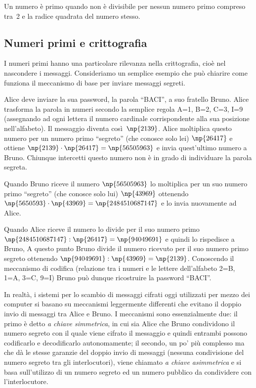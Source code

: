 \osservazione Un numero è primo quando non è divisibile per nessun numero primo compreso tra~2 e
la radice quadrata del numero stesso.

\subsection{Numeri primi e crittografia}
I numeri primi hanno una particolare rilevanza nella crittografia, cioè nel nascondere i messaggi. Consideriamo un semplice esempio che può chiarire come funziona il meccanismo di base per inviare messaggi segreti.

Alice deve inviare la sua password, la parola ``BACI'', a suo fratello Bruno. Alice trasforma la parola in numeri secondo la semplice regola A=1, B=2, C=3, I=9 (assegnando ad ogni lettera il numero cardinale corrispondente alla sua posizione nell'alfabeto). Il messaggio diventa così~$ \np{2139} $. Alice moltiplica questo numero per un numero primo ``segreto'' (che conosce solo lei) $\np{26417}$ e ottiene $\np{2139} \cdot \np{26417}=\np{56505963}$ e invia quest'ultimo numero a Bruno. Chiunque intercetti questo numero non è in grado di individuare la parola segreta.

Quando Bruno riceve il numero $ \np{56505963} $ lo moltiplica per un suo numero primo ``segreto'' (che conosce solo lui) $\np{43969}$ ottenendo $\np{5650593} \cdot \np{43969}=\np{2484510687147}$ e lo invia nuovamente ad Alice.

Quando Alice riceve il numero lo divide per il suo numero primo $\np{2484510687147} : \np{26417} = \np{94049691}$ e quindi lo rispedisce a Bruno,
A questo punto Bruno divide il numero ricevuto per il suo numero primo segreto ottenendo $\np{94049691} : \np{43969} = \np{2139}$. Conoscendo il meccanismo di codifica (relazione tra i numeri e le lettere dell'alfabeto  2=B, 1=A, 3=C, 9=I) Bruno può dunque ricostruire la password ``BACI''.

In realtà, i sistemi per lo scambio di messaggi cifrati oggi utilizzati per mezzo dei computer si basano su meccanismi leggermente differenti che evitano il doppio invio di messaggi tra Alice e Bruno. I meccanismi sono essenzialmente due: il primo è detto \emph{a chiave simmetrica}, in cui sia Alice che Bruno condividono il numero segreto con il quale viene cifrato il messaggio e quindi entrambi possono codificarlo e decodificarlo autonomamente; il secondo, un po' più complesso ma che dà le stesse garanzie del doppio invio di messaggi (nessuna condivisione del numero segreto tra gli interlocutori), viene chiamato \emph{a chiave asimmetrica} e si basa sull'utilizzo di un numero segreto ed un numero pubblico da condividere con l'interlocutore.


